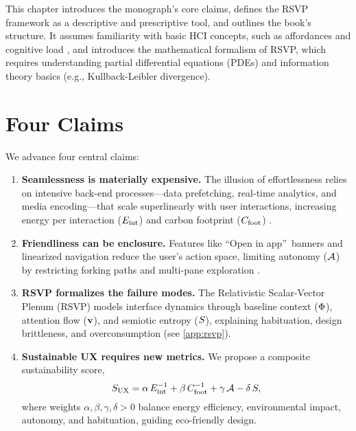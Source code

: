 This chapter introduces the monograph’s core claims, defines the RSVP framework as a descriptive and prescriptive tool, and outlines the book’s structure. It assumes familiarity with basic HCI concepts, such as affordances and cognitive load \citep{norman1988}, and introduces the mathematical formalism of RSVP, which requires understanding partial differential equations (PDEs) and information theory basics (e.g., Kullback-Leibler divergence).

\section{Four Claims}
\label{sec:intro-claims}
We advance four central claims:
\begin{enumerate}[label=\textbf{C\arabic*}.]
  \item \textbf{Seamlessness is materially expensive.} The illusion of effortlessness relies on intensive back-end processes---data prefetching, real-time analytics, and media encoding---that scale superlinearly with user interactions, increasing energy per interaction (\(E_{\mathrm{int}}\)) and carbon footprint (\(C_{\mathrm{foot}}\)) \citep{extentia2024}.
  \item \textbf{Friendliness can be enclosure.} Features like \textquotedblleft Open in app\textquotedblright\ banners and linearized navigation reduce the user’s action space, limiting autonomy (\(\mathcal{A}\)) by restricting forking paths and multi-pane exploration \citep{doctorow2022}.
  \item \textbf{RSVP formalizes the failure modes.} The Relativistic Scalar-Vector Plenum (RSVP) models interface dynamics through baseline context (\(\Phi\)), attention flow (\(\mathbf{v}\)), and semiotic entropy (\(S\)), explaining habituation, design brittleness, and overconsumption (see \cref{app:rsvp}).
  \item \textbf{Sustainable UX requires new metrics.} We propose a composite sustainability score,
  \begin{equation}
  \label{eq:intro-SUX}
  S_{\mathrm{UX}} = \alpha\,E_{\mathrm{int}}^{-1} + \beta\,C_{\mathrm{foot}}^{-1} + \gamma\,\mathcal{A} - \delta\,S,
  \end{equation}
  where weights \(\alpha, \beta, \gamma, \delta > 0\) balance energy efficiency, environmental impact, autonomy, and habituation, guiding eco-friendly design.
\end{enumerate}

